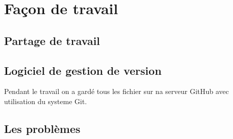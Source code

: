 \documentclass[10pt, a4paper]{article}
\begin{document}
	\section{Façon de travail}
		\subsection{Partage de travail}
		
		
		\subsection{Logiciel de gestion de version}
		Pendant le travail on a gardé tous les fichier sur na serveur GitHub avec utilisation du systeme 
		Git.
		
		\subsection{Les problèmes}
		
		
	


\end{document}
